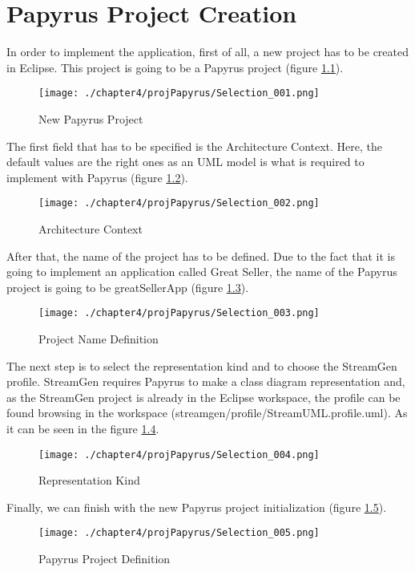 \chapter{Papyrus Project Creation}
\label{sec:Appendix1}

In order to implement the application, first of all, a new project has to be created in Eclipse. This project is going to be a Papyrus project (figure \ref{fig:Papyrus Project}).

\begin{figure}
\centering
{\texttt{[image: ./chapter4/projPapyrus/Selection\_001.png]}}
\caption{New Papyrus Project}
\label{fig:Papyrus Project}
\end{figure}

The first field that has to be specified is the Architecture Context. Here, the default values are the right ones as an UML model is what is required to implement with Papyrus (figure \ref{fig:Architecture Context}).

\begin{figure}
\centering
{\texttt{[image: ./chapter4/projPapyrus/Selection\_002.png]}}
\caption{Architecture Context}
\label{fig:Architecture Context}
\end{figure}

After that, the name of the project has to be defined. Due to the fact that it is going to implement an application called Great Seller, the name of the Papyrus project is going to be greatSellerApp (figure \ref{fig:Project Name Definition}).

\begin{figure}
\centering
{\texttt{[image: ./chapter4/projPapyrus/Selection\_003.png]}}
\caption{Project Name Definition}
\label{fig:Project Name Definition}
\end{figure}

The next step is to select the representation kind and to choose the StreamGen profile. StreamGen requires Papyrus to make a class diagram representation and, as the StreamGen project is already in the Eclipse workspace, the profile can be found browsing in the workspace (streamgen/profile/StreamUML.profile.uml). As it can be seen in the figure \ref{fig:Representation Kind}.

\begin{figure}
\centering
{\texttt{[image: ./chapter4/projPapyrus/Selection\_004.png]}}
\caption{Representation Kind}
\label{fig:Representation Kind}
\end{figure}

Finally, we can finish with the new Papyrus project initialization (figure \ref{fig:Papyrus Project Definition}).

\begin{figure}
\centering
{\texttt{[image: ./chapter4/projPapyrus/Selection\_005.png]}}
\caption{Papyrus Project Definition}
\label{fig:Papyrus Project Definition}
\end{figure}
